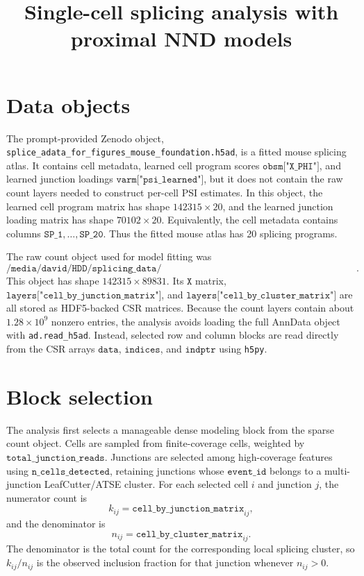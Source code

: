 \documentclass[11pt]{article}
\title{Single-cell splicing analysis with proximal NND models}
\author{}
\date{}
\begin{document}
\maketitle

\section{Data objects}

The prompt-provided Zenodo object,
\texttt{splice\_adata\_for\_figures\_mouse\_foundation.h5ad}, is a fitted
mouse splicing atlas.  It contains cell metadata, learned cell program scores
\(\texttt{obsm["X\_PHI"]}\), and learned junction loadings
\(\texttt{varm["psi\_learned"]}\), but it does not contain the raw count layers
needed to construct per-cell PSI estimates.  In this object, the learned cell
program matrix has shape \(142315 \times 20\), and the learned junction loading
matrix has shape \(70102 \times 20\).  Equivalently, the cell metadata contains
columns \(\texttt{SP\_1},\ldots,\texttt{SP\_20}\).  Thus the fitted mouse atlas
has 20 splicing programs.

The raw count object used for model fitting was
\[
\texttt{/media/david/HDD/splicing\_data/model\_ready\_aligned\_splicing\_data\_20251009\_024406.h5ad}.
\]
This object has shape \(142315 \times 89831\).  Its \(\texttt{X}\) matrix,
\(\texttt{layers["cell\_by\_junction\_matrix"]}\), and
\(\texttt{layers["cell\_by\_cluster\_matrix"]}\) are all stored as HDF5-backed
CSR matrices.  Because the count layers contain about \(1.28\times 10^9\)
nonzero entries, the analysis avoids loading the full AnnData object with
\texttt{ad.read\_h5ad}.  Instead, selected row and column blocks are read
directly from the CSR arrays \(\texttt{data}\), \(\texttt{indices}\), and
\(\texttt{indptr}\) using \texttt{h5py}.

\section{Block selection}

The analysis first selects a manageable dense modeling block from the sparse
count object.  Cells are sampled from finite-coverage cells, weighted by
\(\texttt{total\_junction\_reads}\).  Junctions are selected among high-coverage
features using \(\texttt{n\_cells\_detected}\), retaining junctions whose
\(\texttt{event\_id}\) belongs to a multi-junction LeafCutter/ATSE cluster.
For each selected cell \(i\) and junction \(j\), the numerator count is
\[
k_{ij} = \texttt{cell\_by\_junction\_matrix}_{ij},
\]
and the denominator is
\[
n_{ij} = \texttt{cell\_by\_cluster\_matrix}_{ij}.
\]
The denominator is the total count for the corresponding local splicing
cluster, so \(k_{ij}/n_{ij}\) is the observed inclusion fraction for that
junction whenever \(n_{ij}>0\).
\end{document}
